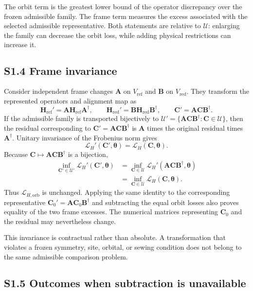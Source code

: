 The orbit term is the greatest lower bound of the operator discrepancy over the
frozen admissible family. The frame term measures the excess associated with
the selected admissible representative. Both statements are relative to
$\mathcal U$: enlarging the family can decrease the orbit loss, while adding
physical restrictions can increase it.

\subsection*{S1.4 Frame invariance}

Consider independent frame changes $\bm A$ on $V_{\mathrm{ref}}$ and $\bm B$
on $V_{\mathrm{red}}$. They transform the represented operators and alignment
map as
\[
 \bm H_{\mathrm{ref}}' =\bm A\bm H_{\mathrm{ref}}\bm A^\dagger,
 \qquad
 \bm H_{\mathrm{red}}' =\bm B\bm H_{\mathrm{red}}\bm B^\dagger,
 \qquad
 \bm C'=\bm A\bm C\bm B^\dagger.
\]
If the admissible family is transported bijectively to
$\mathcal U'=\{\bm A\bm C\bm B^\dagger:\bm C\in\mathcal U\}$, then the
residual corresponding to $\bm C'=\bm A\bm C\bm B^\dagger$ is $\bm A$ times
the original residual times $\bm A^\dagger$. Unitary invariance of the
Frobenius norm gives
\[
 \mathcal L_H'(\bm C',\bm\theta)=\mathcal L_H(\bm C,\bm\theta).
\]
Because $\bm C\mapsto\bm A\bm C\bm B^\dagger$ is a bijection,
\begin{align*}
 \inf_{\bm C'\in\mathcal U'}\mathcal L_H'(\bm C',\bm\theta)
 &=\inf_{\bm C\in\mathcal U}
   \mathcal L_H'(\bm A\bm C\bm B^\dagger,\bm\theta)\\
 &=\inf_{\bm C\in\mathcal U}\mathcal L_H(\bm C,\bm\theta).
\end{align*}
Thus $\mathcal L_{H,\mathrm{orb}}$ is unchanged. Applying the same identity to
the corresponding representative
$\bm C_0'=\bm A\bm C_0\bm B^\dagger$ and subtracting the equal orbit losses
also proves equality of the two frame excesses. The numerical matrices
representing $\bm C_0$ and the residual may nevertheless change.

This invariance is contractual rather than absolute. A transformation that
violates a frozen symmetry, site, orbital, or sewing condition does not belong
to the same admissible comparison problem.

\subsection*{S1.5 Outcomes when subtraction is unavailable}

